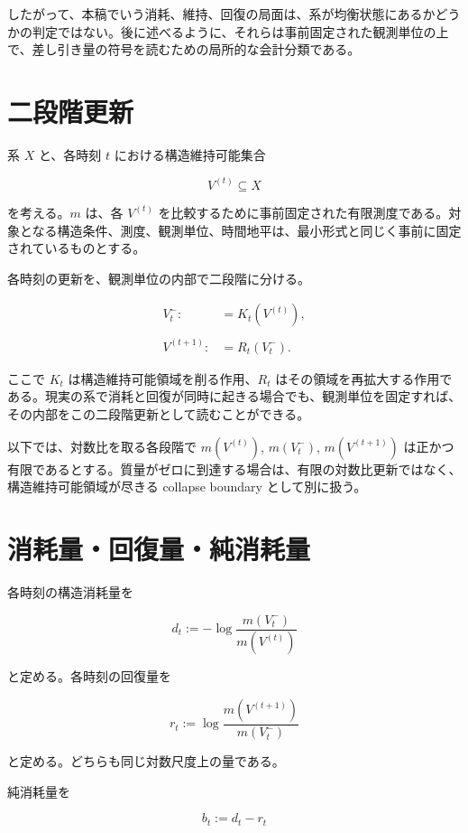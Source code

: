\documentclass[12pt,a4paper]{article}
\begin{document}
したがって、本稿でいう消耗、維持、回復の局面は、系が均衡状態にあるかどうかの判定ではない。後に述べるように、それらは事前固定された観測単位の上で、差し引き量の符号を読むための局所的な会計分類である。

\section{二段階更新}\label{ux4e8cux6bb5ux968eux66f4ux65b0}

系 \(X\) と、各時刻 \(t\) における構造維持可能集合

\[
V^{(t)} \subseteq X
\]

を考える。\(m\) は、各 \(V^{(t)}\) を比較するために事前固定された有限測度である。対象となる構造条件、測度、観測単位、時間地平は、最小形式と同じく事前に固定されているものとする。

各時刻の更新を、観測単位の内部で二段階に分ける。

\[
\begin{aligned}
V_{t}^- :&= K_{t}(V^{(t)}), \\
\qquad \\
V^{(t+1)} :&= R_{t}(V_{t}^-).
\end{aligned}
\]

ここで \(K_{t}\) は構造維持可能領域を削る作用、\(R_{t}\) はその領域を再拡大する作用である。現実の系で消耗と回復が同時に起きる場合でも、観測単位を固定すれば、その内部をこの二段階更新として読むことができる。

以下では、対数比を取る各段階で \(m(V^{(t)})\), \(m(V_{t}^-)\), \(m(V^{(t+1)})\) は正かつ有限であるとする。質量がゼロに到達する場合は、有限の対数比更新ではなく、構造維持可能領域が尽きる collapse boundary として別に扱う。

\section{消耗量・回復量・純消耗量}\label{ux6d88ux8017ux91cfux56deux5fa9ux91cfux7d14ux6d88ux8017ux91cf}

各時刻の構造消耗量を

\[
d_{t} := -\log \frac{m(V_{t}^-)}{m(V^{(t)})}
\]

と定める。各時刻の回復量を

\[
r_{t} := \log \frac{m(V^{(t+1)})}{m(V_{t}^-)}
\]

と定める。どちらも同じ対数尺度上の量である。

純消耗量を

\[
b_{t} := d_{t}-r_{t}
\]
\end{document}

